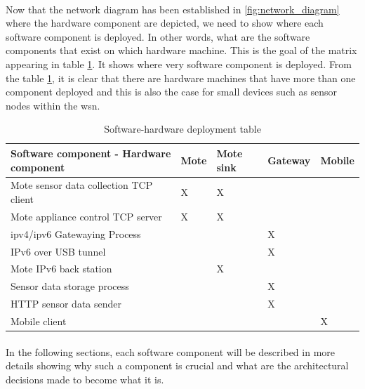 \documentclass[oneside,12pt,a4paper,final]{book}
\begin{document}
\paragraph{}
Now that the network diagram has been established in \ref{fig:network_diagram} where the hardware component are depicted, we need to show where each software component is deployed. In other words, what are the software components that exist on which hardware machine. This is the goal of the matrix appearing in table \ref{table:soft_hard_deployment}. It shows where very software component is deployed. From the table \ref{table:soft_hard_deployment}, it is clear that there are hardware machines that have more than one component deployed and this is also the case for small devices such as sensor nodes within the \gls{wsn}.

\begin{table}
    \begin{tabular}{lllll}
    		  \hline
    Software component - Hardware component & Mote & Mote sink & Gateway & Mobile \\ \hline
    Mote sensor data collection TCP client  & X    & X         & ~       & ~      \\ 
    Mote appliance control TCP server       & X    & X         & ~       & ~      \\
    \gls{ipv4}/\gls{ipv6} Gatewaying Process   & ~    & ~         & X       & ~      \\
    IPv6 over USB tunnel                    & ~    & ~         & X       & ~      \\
    Mote IPv6 back station                   & ~    & X         & ~       & ~      \\
    Sensor data storage process             & ~    & ~         & X       & ~      \\
    HTTP sensor data sender                 & ~    & ~         & X       & ~      \\
    Mobile client                           & ~    & ~         & ~       & X      \\
    \end{tabular}
    \caption{Software-hardware deployment table}
    \label{table:soft_hard_deployment}
\end{table}

\paragraph{}
In the following sections, each software component will be described in more details showing why such a component is crucial and what are the architectural decisions made to become what it is.
\end{document}
